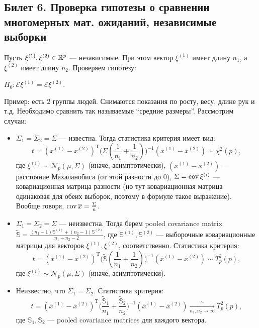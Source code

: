 \subsection{Билет 6. Проверка гипотезы о сравнении многомерных мат. ожиданий, независимые выборки}
Пусть $\xi^{(1)}, \xi^{(2)} \in \mathbb{R}^p$  --- независимые. При этом вектор $\xi^{(1)}$ имеет длину $n_1$, а $\xi^{(2)}$ имеет длину $n_2$. Проверяем гипотезу:

$H_0: \mathcal{E}\xi^{(1)} = \mathcal{E}\xi^{(2)}$.

Пример: есть 2 группы людей. Снимаются показания по росту, весу, длине рук и т.д. Необходимо сравнить так называемые ``средние размеры''. Рассмотрим случаи:
\begin{itemize}
\item $\Sigma_1 = \Sigma_2 = \Sigma$ --- известна. Тогда статистика критерия имеет вид:
%
\begin{equation*}
t = (\bar{x}^{(1)} - \bar{x}^{(2)})^{\mathrm{T}} \Big (\Sigma (\frac{1}{n_1} + \frac{1}{n_2}) \Big )^{-1} (\bar{x}^{(1)} - \bar{x}^{(2)}) \sim \chi^2 (p),
\end{equation*}
%
где $\xi^{(i)} \sim \mathcal{N}_p (\mu,\Sigma)$ (иначе, асимптотически), $(\bar{x}^{(1)} - \bar{x}^{(2)})$ --- расстояние Махаланобиса (от этой разности до 0), $\Sigma = \operatorname{cov} \xi^{(i)}$ --- ковариационная матрица разности (но тут ковариационная матрица одинаковая для обеих выборок, поэтому в формуле такое выражение). Вообще говоря, $\operatorname{cov} \overline{x} = \frac{\Sigma}{n}$.
\item $\Sigma_1 = \Sigma_2 = \Sigma$ --- неизвестна. Тогда берем pooled covariance matrix $\tilde{\mathbb{S}} = \frac{(n_1 - 1)\mathbb{S}^{(1)} + (n_2 - 1)\mathbb{S}^{(2)}}{n_1 + n_2 - 2}$, где $\mathbb{S}^{(1)}, \mathbb{S}^{(2)}$ --- выборочные ковариационные матрицы для векторов $\xi^{(1)}, \xi^{(2)}$, соответственно.
Статистика критерия:
%
\begin{equation*}
t = (\bar{x}^{(1)} - \bar{x}^{(2)})^{\mathrm{T}} \Big (\tilde{\mathbb{S}} (\frac{1}{n_1} + \frac{1}{n_2}) \Big )^{-1} (\bar{x}^{(1)} - \bar{x}^{(2)}) \sim T_p^2 (p),
\end{equation*}
%
где $\xi^{(i)} \sim \mathcal{N}_p (\mu,\Sigma)$ (иначе, асимптотически).
\item Неизвестно, что $\Sigma_1 = \Sigma_2$.
Статистика критерия:
%
\begin{equation*}
t = (\bar{x}^{(1)} - \bar{x}^{(2)})^{\mathrm{T}} \Big (\frac{\tilde{\mathbb{S}}_1}{n_1} + \frac{\tilde{\mathbb{S}}_2}{n_2} \Big )^{-1} (\bar{x}^{(1)} - \bar{x}^{(2)}) \xrightarrow[n_1, n_2 \rightarrow \infty]{\sim} T_p^2 (p),
\end{equation*}
%
где $\mathbb{S}_1, \mathbb{S}_2$ --- pooled covariance matrices для каждого вектора.
\end{itemize}
